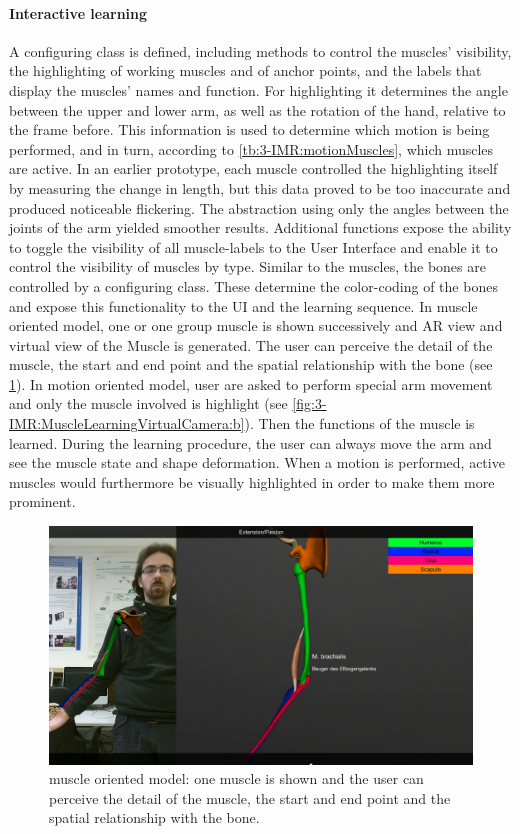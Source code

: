 \paragraph{Interactive learning}
A configuring class is defined, including methods to control the muscles' visibility, the highlighting of working muscles and of anchor points, and the labels that display the muscles' names and function. For highlighting it determines the angle between the upper and lower arm, as well as the rotation of the hand, relative to the frame before. This information is used to determine which motion is being performed, and in turn, according to \tablename{\ref{tb:3-IMR:motionMuscles}}, which muscles are active. 
In an earlier prototype, each muscle controlled the highlighting itself by measuring the change in length, but this data proved to be too inaccurate and produced noticeable flickering. The abstraction using only the angles between the joints of the arm yielded smoother results. Additional functions expose the ability to toggle the visibility of all muscle-labels to the User Interface and enable it to control the visibility of muscles by type.
Similar to the muscles, the bones are controlled by a configuring class. These determine the color-coding of the bones and expose this functionality to the UI and the learning sequence.
In muscle oriented model, one or one group muscle is shown successively and AR view and virtual view of the Muscle is generated. The user can perceive the detail of the muscle, the start and end point and the spatial relationship with the bone (see \figurename{\ref{fig:3-IMR:muscleModelLearning}}). In motion oriented model, user are asked to perform special arm movement and only the muscle involved is highlight (see \figurename{\ref{fig:3-IMR:MuscleLearningVirtualCamera:b}}). Then the functions of the muscle is learned. 
During the learning procedure, the user can always move the arm and see the muscle state and shape deformation.
When a motion is performed, active muscles would furthermore be visually highlighted in order to make them more prominent.
\begin{figure}
\centering
\includegraphics[width=0.7\linewidth]{figures/3-IMR/muscleModel}
\caption{muscle oriented model: one muscle is shown and the user can perceive the detail of the muscle, the start and end point and the spatial relationship with the bone.}
\label{fig:3-IMR:muscleModelLearning}
\end{figure}

